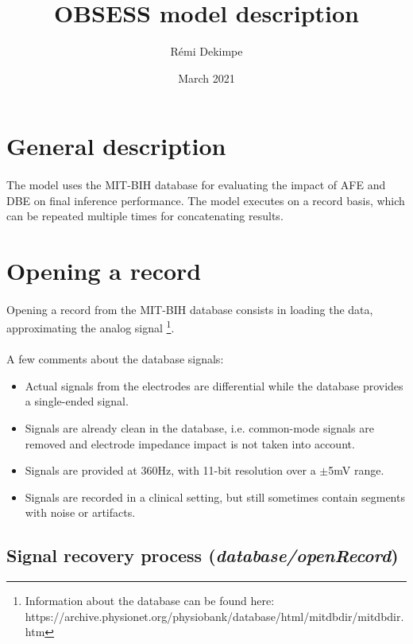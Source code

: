 \documentclass[a4paper,10pt,twoside]{article}
\title{OBSESS model description}
\author{Rémi Dekimpe}
\date{March 2021}
\begin{document}
\maketitle

\section{General description}

\paragraph{}The model uses the MIT-BIH database for evaluating the impact of AFE and DBE on final inference performance. The model executes on a record basis, which can be repeated multiple times for concatenating results. 

\section{Opening a record}
\label{section:open}
\paragraph{}Opening a record from the MIT-BIH database consists in loading the data, approximating the analog signal \footnote{Information about the database can be found here: https://archive.physionet.org/physiobank/database/html/mitdbdir/mitdbdir.htm}.

\paragraph{}A few comments about the database signals:
\begin{itemize}
\item Actual signals from the electrodes are differential while the database provides a single-ended signal. 
\item Signals are already clean in the database, i.e. common-mode signals are removed and electrode impedance impact is not taken into account. 
\item Signals are provided at 360Hz, with 11-bit resolution over a $\pm$5mV range.
\item Signals are recorded in a clinical setting, but still sometimes contain segments with noise or artifacts.  
\end{itemize}

\subsection{Signal recovery process (\textit{database/openRecord})}
\end{document}
